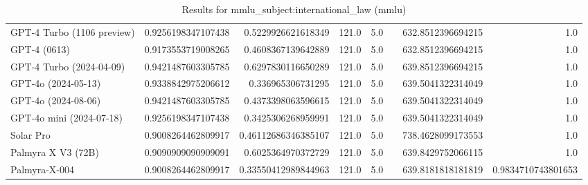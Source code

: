 \begin{table}[htp]
{\begin{tabular}{lrrrrrrr}
GPT-4 Turbo (1106 preview) & 0.9256198347107438 & 0.5229926621618349 & 121.0 & 5.0 &  & 632.8512396694215 & 1.0 \\
GPT-4 (0613) & 0.9173553719008265 & 0.4608367139642889 & 121.0 & 5.0 &  & 632.8512396694215 & 1.0 \\
GPT-4 Turbo (2024-04-09) & 0.9421487603305785 & 0.6297830116650289 & 121.0 & 5.0 &  & 639.8512396694215 & 1.0 \\
GPT-4o (2024-05-13) & 0.9338842975206612 & 0.336965306731295 & 121.0 & 5.0 &  & 639.5041322314049 & 1.0 \\
GPT-4o (2024-08-06) & 0.9421487603305785 & 0.4373398063596615 & 121.0 & 5.0 &  & 639.5041322314049 & 1.0 \\
GPT-4o mini (2024-07-18) & 0.9256198347107438 & 0.3425306268959991 & 121.0 & 5.0 &  & 639.5041322314049 & 1.0 \\
Solar Pro & 0.9008264462809917 & 0.46112686346385107 & 121.0 & 5.0 &  & 738.4628099173553 & 1.0 \\
Palmyra X V3 (72B) & 0.9090909090909091 & 0.6025364970372729 & 121.0 & 5.0 &  & 639.8429752066115 & 1.0 \\
Palmyra-X-004 & 0.9008264462809917 & 0.33550412989844963 & 121.0 & 5.0 &  & 639.8181818181819 & 0.9834710743801653 \\
\bottomrule
\end{tabular}}
\caption{Results for mmlu_subject:international_law (mmlu)}
\label{fig:mmlu_subject:international_law (mmlu)}
\end{table}